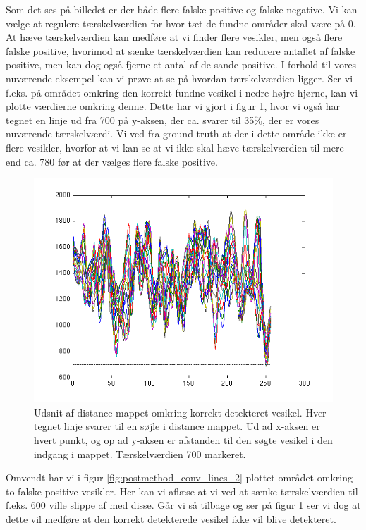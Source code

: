 Som det ses på billedet er der både flere falske positive og falske negative. Vi kan vælge at regulere tærskelværdien for hvor tæt de fundne områder skal være på 0. At hæve tærskelværdien kan medføre at vi finder flere vesikler, men også flere falske positive, hvorimod at sænke tærskelværdien kan reducere antallet af falske positive, men kan dog også fjerne et antal af de sande positive. I forhold til vores nuværende eksempel kan vi prøve at se på hvordan tærskelværdien ligger. Ser vi f.eks. på området omkring den korrekt fundne vesikel i nedre højre hjørne, kan vi plotte værdierne omkring denne. Dette har vi gjort i figur \ref{fig:postmethod_conv_lines_1}, hvor vi også har tegnet en linje ud fra 700 på y-aksen, der ca. svarer til 35\%, der er vores nuværende tærskelværdi. Vi ved fra ground truth at der i dette område ikke er flere vesikler, hvorfor at vi kan se at vi ikke skal hæve tærskelværdien til mere end ca. 780 før at der vælges flere falske positive. 

\begin{figure}[H]
		\centering
		\includegraphics[scale=0.9]{files/postmethod/img/conv_lines_1.png}
	\caption{Udsnit af distance mappet omkring korrekt detekteret vesikel. Hver tegnet linje svarer til en søjle i distance mappet. Ud ad x-aksen er hvert punkt, og op ad y-aksen er afstanden til den søgte vesikel i den indgang i mappet. Tærskelværdien 700 markeret.\label{fig:postmethod_conv_lines_1}}
\end{figure}

Omvendt har vi i figur \ref{fig:postmethod_conv_lines_2} plottet området omkring to falske positive vesikler. Her kan vi aflæse at vi ved at sænke tærskelværdien til f.eks. 600 ville slippe af med disse. Går vi så tilbage og ser på figur \ref{fig:postmethod_conv_lines_1} ser vi dog at dette vil medføre at den korrekt detekterede vesikel ikke vil blive detekteret.

